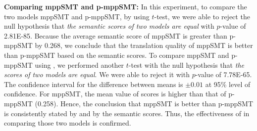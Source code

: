 \noindent \textbf{Comparing mppSMT and p-mppSMT:} In this experiment, 
to compare the two models mppSMT and p-mppSMT, by using $t$-test, we
were able to reject the null hypothesis that \textit{the semantic
scores of two models are equal} with $p$-value of 2.81E-85. Because
the average semantic score of mppSMT is greater than p-mppSMT by
0.268, we conclude that the translation quality of mppSMT is better
than p-mppSMT based on the semantic scores.
%
To compare mppSMT and p-mppSMT using {\model}, we performed another
$t$-test with the null hypothesis that \textit{the {\model} scores of
two models are equal}. We were able to reject it with $p$-value of
7.78E-65. The confidence interval for the difference between means is
$\pm0.01$ at 95\% level of confidence. For mppSMT, the mean value of
{\model} scores is higher than that of p-mppSMT (0.258). Hence, the
conclusion that mppSMT is better than p-mppSMT is consistently stated
by {\model} and by the semantic scores.
Thus, the effectiveness of {\model} in comparing
those two models
is confirmed.

